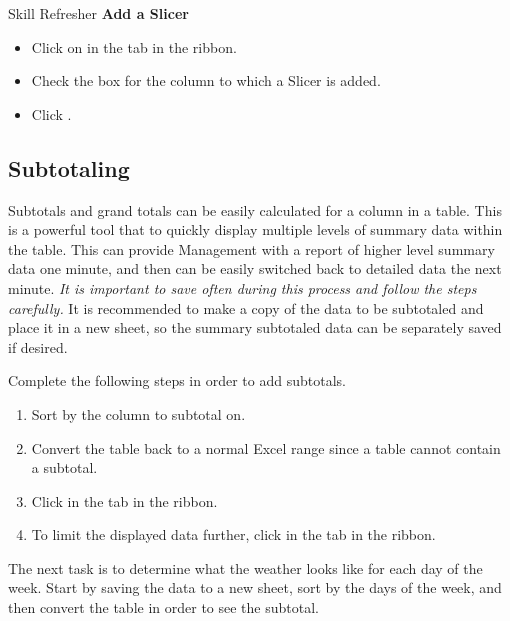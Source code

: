 \begin{center}
	\begin{sklbox}{Skill Refresher}
		\textbf{Add a Slicer}
		\\
		\begin{itemize}
			\setlength{\itemsep}{0pt}
			\setlength{\parskip}{0pt}
			\setlength{\parsep}{0pt}

			\item Click on  in the  tab in the ribbon.
			\item Check the box for the column to which a Slicer is added.
			\item Click .
			
		\end{itemize}
	\end{sklbox}
\end{center}

\subsection{Subtotaling}

Subtotals and grand totals can be easily calculated for a column in a table. This is a powerful tool that to quickly display multiple levels of summary data within the table. This can provide Management with a report of higher level summary data one minute, and then can be easily switched back to detailed data the next minute. \textit{It is important to save often during this process and follow the steps carefully.} It is recommended to make a copy of the data to be subtotaled and place it in a new sheet, so the summary subtotaled data can be separately saved if desired.

Complete the following steps in order to add subtotals.

\begin{enumerate}
	\item Sort by the column to subtotal on.
	\item Convert the table back to a normal Excel range since a table cannot contain a subtotal.
	\item Click  in the  tab in the ribbon.
	\item To limit the displayed data further, click  in the  tab in the ribbon.
\end{enumerate}

The next task is to determine what the weather looks like for each day of the week. Start by saving the data to a new sheet, sort by the days of the week, and then convert the table in order to see the subtotal.

